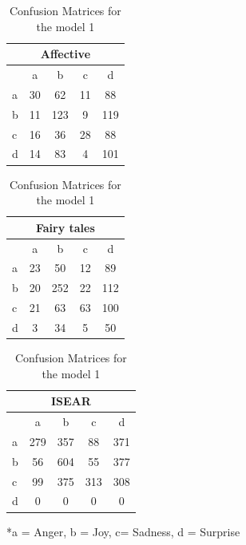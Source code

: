 \documentclass[11pt]{article}
\begin{document}
\begin{table}[hbt]
            \footnotesize
                \begin{tabular}[t]{|l|c|c|c|c|}
                    \hline
                    \multicolumn{5}{|c|}{{Affective}} \\    
                    \hline
                    &a&b&c&d\\ \hline
                    a&30&62&11&88 \\ \hline
                    b&11&123&9&119\\ \hline
                    c&16&36&28&88 \\ \hline   
                    d&14&83&4&101\\ \hline
                \end{tabular}
                \hfill
                \begin{tabular}[t]{|l|c|c|c|c|}
                    \hline
                    \multicolumn{5}{|c|}{{Fairy tales}} \\    
                    \hline
                    &a&b&c&d\\ \hline
                    a&23&50&12&89 \\ \hline
                    b&20&252&22&112\\ \hline
                    c&21&63&63&100 \\ \hline   
                    d&3&34&5&50\\ \hline
                \end{tabular}
                \hfill
                \begin{tabular}[t]{|l|c|c|c|c|}
                    \hline
                    \multicolumn{5}{|c|}{{ISEAR}} \\    
                    \hline
                    &a&b&c&d\\ \hline
                    a&279&357&88&371 \\ \hline
                    b&56&604&55&377\\ \hline
                    c&99&375&313&308 \\ \hline   
                    d&0&0&0&0\\ \hline
                \end{tabular}
                \caption{Confusion Matrices for the model 1}
                \label{Confusion Matrices for the model 1}
                *a = Anger, b = Joy, c= Sadness, d = Surprise
            \end{table}
\end{document}
